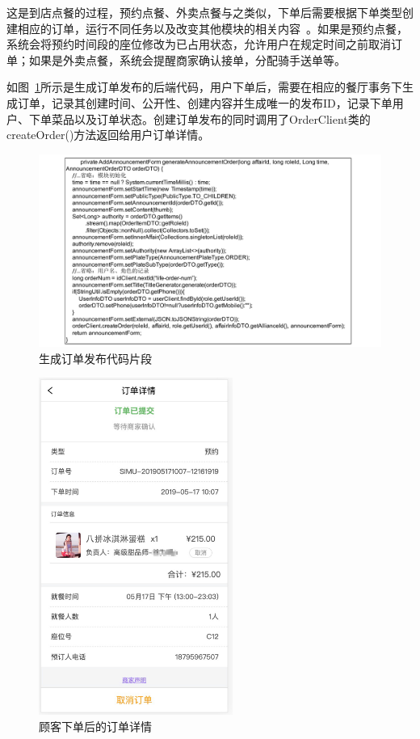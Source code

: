 这是到店点餐的过程，预约点餐、外卖点餐与之类似，下单后需要根据下单类型创建相应的订单，运行不同任务以及改变其他模块的相关内容~\cite{jq2016}。如果是预约点餐，系统会将预约时间段的座位修改为已占用状态，允许用户在规定时间之前取消订单；如果是外卖点餐，系统会提醒商家确认接单，分配骑手送单等。

如图~\ref{fig_order_1}所示是生成订单发布的后端代码，用户下单后，需要在相应的餐厅事务下生成订单，记录其创建时间、公开性、创建内容并生成唯一的发布ID，记录下单用户、下单菜品以及订单状态。创建订单发布的同时调用了OrderClient类的createOrder()方法返回给用户订单详情。

\begin{figure}[htbp!]
    \centering
    \includegraphics[width=\linewidth]{FIGs/chapter4/1.pdf}
    \caption{生成订单发布代码片段}\label{fig_order_1}
\end{figure}

\begin{figure}[htbp!]
    \centering
    \includegraphics[width=2.5in]{FIGs/chapter4/order_view.pdf}
    \caption{顾客下单后的订单详情}\label{fig_order_view}
\end{figure}

